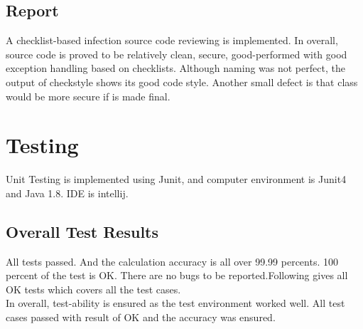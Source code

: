 \documentclass[15pt]{article}
\begin{document}
\begin{CJK*}{UTF8}{gbsn}
{\subsection{Report}
A checklist-based infection source code reviewing is implemented. In overall, source code is proved to be relatively clean, secure, good-performed with good exception handling based on checklists. Although naming was not perfect, the output of checkstyle shows its good code style. Another small defect is that class would be more secure if is made final.
\section{Testing}
Unit Testing is implemented using Junit, and computer environment is Junit4 and Java 1.8. IDE is intellij.
\subsection{Overall Test Results}
All tests passed. And the calculation accuracy is all over 99.99 percents. 100 percent of the test is OK. There are no bugs to be reported.Following gives all OK tests which covers all the test cases.\\
In overall, test-ability is ensured as the test environment worked well. All test cases passed with result of OK and the accuracy was ensured. \\
}
\end{CJK*}
\end{document}
